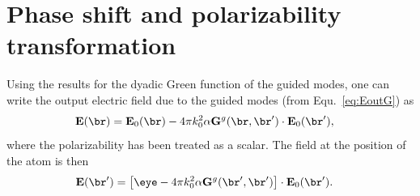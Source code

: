 \documentclass[]{report}
\begin{document}
\section{Phase shift and polarizability transformation}
Using the results for the dyadic Green function of the guided modes, one can write the output electric field due to the guided modes (from Equ.~\eqref{eq:EoutG}) as 
\begin{align}
\mathbf{E}(\br) & = \mathbf{E}_0(\br) -4\pi k_0^2 \alpha \mathbf{G}^g(\br,\br')\cdot\mathbf{E}_0(\br'),
\end{align}
where the polarizability has been treated as a scalar. The field at the position of the atom is then
\begin{align}
\mathbf{E}(\br') &= \left[\eye-4\pi k_0^2 \alpha \mathbf{G}^g(\br',\br')\right]\cdot\mathbf{E}_0(\br').
\end{align}
\end{document}
